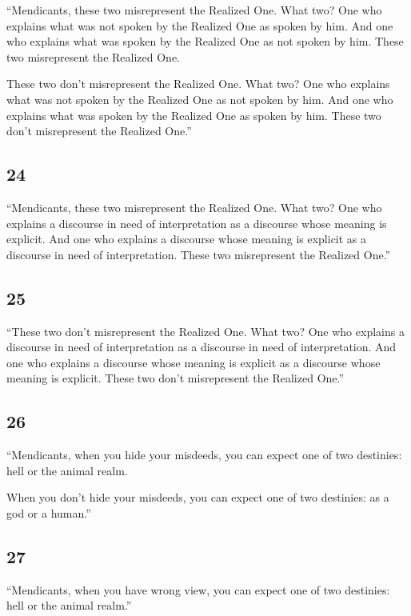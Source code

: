 \documentclass[12pt,openany]{book}%
\begin{document}
“Mendicants, these two misrepresent the Realized One. What two? One who explains what was not spoken by the Realized One as spoken by him. And one who explains what was spoken by the Realized One as not spoken by him. These two misrepresent the Realized One. 

These two don’t misrepresent the Realized One. What two? One who explains what was not spoken by the Realized One as not spoken by him. And one who explains what was spoken by the Realized One as spoken by him. These two don’t misrepresent the Realized One.” 

\subsection*{24 }

“Mendicants, these two misrepresent the Realized One. What two? One who explains a discourse in need of interpretation as a discourse whose meaning is explicit. And one who explains a discourse whose meaning is explicit as a discourse in need of interpretation. These two misrepresent the Realized One.” 

\subsection*{25 }

“These two don’t misrepresent the Realized One. What two? One who explains a discourse in need of interpretation as a discourse in need of interpretation. And one who explains a discourse whose meaning is explicit as a discourse whose meaning is explicit. These two don’t misrepresent the Realized One.” 

\subsection*{26 }

“Mendicants, when you hide your misdeeds, you can expect one of two destinies: hell or the animal realm. 

When you don’t hide your misdeeds, you can expect one of two destinies: as a god or a human.” 

\subsection*{27 }

“Mendicants, when you have wrong view, you can expect one of two destinies: hell or the animal realm.” 
\end{document}
